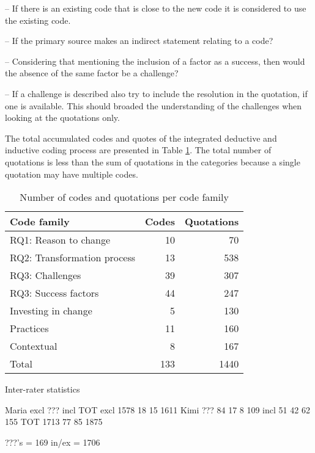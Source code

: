\documentclass[preprint,authoryear,12pt]{elsarticle}
\begin{document}
-- If there is an existing code that is close to the new code it is considered
   to use the existing code.

-- If the primary source makes an indirect statement relating to a code?



-- Considering that mentioning the inclusion of a factor as a success, then
   would the absence of the same factor be a challenge?

-- If a challenge is described also try to include the resolution in the
   quotation, if one is available. This should broaded the understanding of the
   challenges when looking at the quotations only.

The total accumulated codes and quotes of the integrated deductive and inductive
coding process are presented in Table \ref{table:codecount}. The total number of
quotations is less than the sum of quotations in the categories because a single
quotation may have multiple codes.

\begin{table}[h]
    \begin{tabular}{ l r r }
        \toprule
        Code family    &  Codes  &  Quotations
        \\
        \midrule
        RQ1: Reason to change &        10 &   70 \\
		RQ2: Transformation process &  13 &  538 \\
		RQ3: Challenges &              39 &  307 \\
		RQ3: Success factors &         44 &  247 \\
		Investing in change  &          5 &  130 \\
		Practices &                    11 &  160 \\
		Contextual &                    8 &  167 \\
		Total &                       133 & 1440 \\
        \bottomrule
    \end{tabular}
    \caption{Number of codes and quotations per code family}
    \label{table:codecount}
\end{table}


Inter-rater statistics

                    Maria
           excl   ???   incl    TOT
     excl  1578    18    15    1611
Kimi ???     84    17     8     109
     incl    51    42    62     155
     TOT   1713    77    85    1875

???'s =  169
in/ex = 1706
\end{document}

